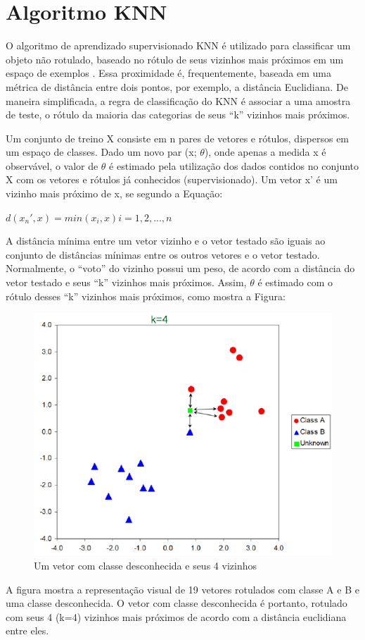 \documentclass[12pt]{article}
\begin{document}
\section{Algoritmo KNN}

O algoritmo de aprendizado supervisionado KNN é utilizado para classificar um
objeto não rotulado, baseado no rótulo de seus vizinhos mais próximos em um
espaço de exemplos \cite{Cechinel:Disertacao:2014}. Essa proximidade é, frequentemente, baseada em uma métrica
de distância entre dois pontos, por exemplo, a distância Euclidiana. De maneira
simplificada, a regra de classificação do KNN é associar a uma amostra de
teste, o rótulo da maioria das categorias de seus ``k'' vizinhos mais próximos. 

Um conjunto de treino X consiste em n pares de vetores e rótulos, dispersos em
um espaço de classes. Dado um novo par (x; $\theta$), onde apenas a medida x é
observável, o valor de $\theta$	é estimado pela utilização dos dados contidos no
conjunto X com os vetores e rótulos já conhecidos (supervisionado). Um vetor x'
é um vizinho mais próximo de x, se segundo a Equação:

$d(x_{n}', x) = min(x_i, x) i = 1, 2, ...,n$

A distância mínima entre um vetor vizinho e o vetor testado são iguais ao 
conjunto de distâncias mínimas entre os outros vetores e o vetor testado.
Normalmente, o ``voto'' do vizinho possui um peso, de acordo com a distância do 
vetor testado e seus ``k'' vizinhos mais próximos. Assim, $\theta$ é estimado 
com o rótulo desses ``k'' vizinhos mais próximos, como mostra a Figura:

\begin{figure}[ht]
	\centering
	\includegraphics[width=.5\textwidth]{img/knn.png}
	\caption{Um vetor com classe desconhecida e seus 4 vizinhos}
	\label{fig:fig1}
\end{figure}

A figura mostra a representação visual de 19 vetores rotulados com classe A e B
e uma classe desconhecida. O vetor com classe desconhecida é portanto, rotulado
com seus 4 (k=4) vizinhos mais próximos de acordo com a distância euclidiana 
entre eles.
\end{document}
